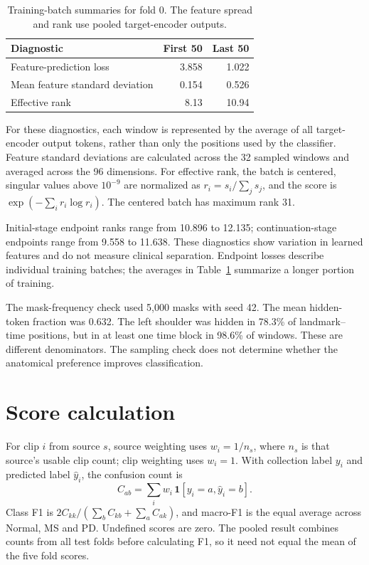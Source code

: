 \documentclass[10pt,twocolumn,letterpaper]{article}
\begin{document}
\begin{table}[t]
\centering\small
\begin{tabular}{lrr}
\toprule
Diagnostic & First 50 & Last 50\\
\midrule
Feature-prediction loss & 3.858 & 1.022\\
Mean feature standard deviation & 0.154 & 0.526\\
Effective rank & 8.13 & 10.94\\
\bottomrule
\end{tabular}
\caption{Training-batch summaries for fold 0. The feature spread and rank use pooled target-encoder outputs.}
\label{tab:training}
\end{table}

For these diagnostics, each window is represented by the average of all target-encoder output tokens, rather than only the positions used by the classifier. Feature standard deviations are calculated across the 32 sampled windows and averaged across the 96 dimensions. For effective rank, the batch is centered, singular values above $10^{-9}$ are normalized as $r_i=s_i/\sum_j s_j$, and the score is $\exp(-\sum_i r_i\log r_i)$. The centered batch has maximum rank 31.

Initial-stage endpoint ranks range from 10.896 to 12.135; continuation-stage endpoints range from 9.558 to 11.638. These diagnostics show variation in learned features and do not measure clinical separation. Endpoint losses describe individual training batches; the averages in Table~\ref{tab:training} summarize a longer portion of training.

The mask-frequency check used 5,000 masks with seed 42. The mean hidden-token fraction was 0.632. The left shoulder was hidden in 78.3\% of landmark--time positions, but in at least one time block in 98.6\% of windows. These are different denominators. The sampling check does not determine whether the anatomical preference improves classification.

\section{Score calculation}
For clip $i$ from source $s$, source weighting uses $w_i=1/n_s$, where $n_s$ is that source's usable clip count; clip weighting uses $w_i=1$. With collection label $y_i$ and predicted label $\widehat y_i$, the confusion count is
\begin{equation}
C_{ab}=\sum_i w_i\,\mathbf{1}[y_i=a,\widehat y_i=b].
\end{equation}
Class F1 is $2C_{kk}/(\sum_b C_{kb}+\sum_a C_{ak})$, and macro-F1 is the equal average across Normal, MS and PD. Undefined scores are zero. The pooled result combines counts from all test folds before calculating F1, so it need not equal the mean of the five fold scores.
\end{document}
